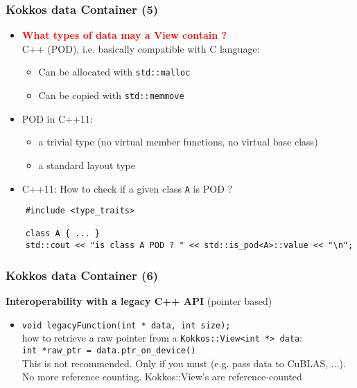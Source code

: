\begin{frame}[fragile=singleslide]
  \frametitle{Kokkos data Container (5)}

  \begin{itemize}
  \item \textcolor{red}{\textbf{What types of data may a View contain ?}}\\
    C++  (POD), i.e. basically compatible with C language:
    \begin{itemize}
    \item Can be allocated with \texttt{std::malloc}
    \item Can be copied with \texttt{std::memmove}
    \end{itemize}
  \item POD in C++11: 
    \begin{itemize}
    \item a trivial type (no virtual member functions, no virtual base class)
    \item a standard layout type
    \end{itemize}
  \item C++11: How to check if a given class \texttt{A} is POD ?
  \end{itemize}
  \begin{verbatim}
    #include <type_traits>
    
    class A { ... }
    std::cout << "is class A POD ? " << std::is_pod<A>::value << "\n";
  \end{verbatim}
  
\end{frame}

\begin{frame}[fragile=singleslide]
  \frametitle{Kokkos data Container (6)}

  {\Large \bf Interoperability with a legacy C++ API} (pointer based)

  \begin{itemize}
  \item \texttt{void legacyFunction(int * data, int size);}\\
    how to retrieve a raw pointer from a \texttt{Kokkos::View<int *> data}:\\
    \texttt{int *raw\_ptr = data.ptr\_on\_device()} \\
    This is not recommended. Only if you must (e.g. pass data to CuBLAS, ...).\\
    No more reference counting. Kokkos::View's are reference-counted
  \end{itemize}

\end{frame}
